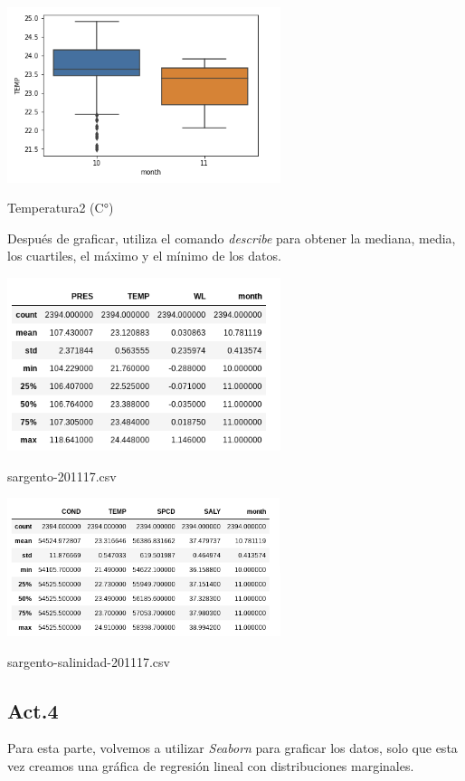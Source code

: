 \documentclass{article}
\begin{document}
\begin{center}
	\includegraphics[width=8cm]{BxPltTEMPSALY.png}
    
    Temperatura2 (C°) 
\end{center}
\vspace{0.3cm}

Después de graficar, utiliza el comando \textit{describe} para obtener la mediana, media, los cuartiles, el máximo y el mínimo de los datos.

\begin{center}
	\includegraphics[width=8cm]{DescribeN.png}
    
    sargento-201117.csv
\end{center}
\vspace{0.3cm}

\begin{center}
	\includegraphics[width=8cm]{DescribeS.png}
    
    sargento-salinidad-201117.csv
\end{center}
\vspace{0.3cm}

\subsection*{Act.4}
Para esta parte, volvemos a utilizar \textit{Seaborn} para graficar los datos, solo que esta vez creamos una gráfica de regresión lineal con distribuciones marginales.
\end{document}
